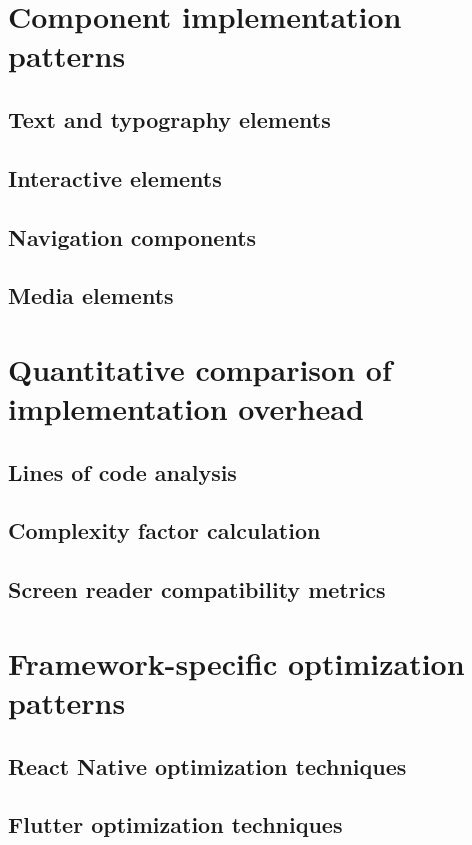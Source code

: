 \section{Component implementation patterns}
\subsection{Text and typography elements}
\subsection{Interactive elements}
\subsection{Navigation components}
\subsection{Media elements}

\section{Quantitative comparison of implementation overhead}
\subsection{Lines of code analysis}
\subsection{Complexity factor calculation}
\subsection{Screen reader compatibility metrics}

\section{Framework-specific optimization patterns}
\subsection{React Native optimization techniques}
\subsection{Flutter optimization techniques}
